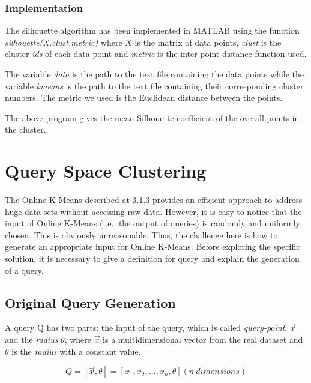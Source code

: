 \documentclass{lmproj}
\begin{document}
\subsubsection{Implementation}
The silhouette algorithm has been implemented in MATLAB using the function \textit{silhouette(X,clust,metric)} where $X$ is the matrix of data points, \textit{clust} is the cluster \textit{ids} of each data point and \textit{metric} is the inter-point distance function used. 

The variable \textit{data} is the path to the text file containing the data points while the variable \textit{kmeans} is the path to the text file containing their corresponding cluster numbers. The metric we used is the Euclidean distance between the points.


The above program gives the mean Silhouette coefficient of the overall points in the cluster.

\clearpage
\section{Query Space Clustering}

The Online K-Means described at 3.1.3 provides an efficient approach to address huge data sets without accessing raw data. However, it is easy to notice that the input of Online K-Means (i.e., the output of queries) is randomly and uniformly chosen. This is obviously unreasonable. Thus, the challenge here is how to generate an appropriate input for Online K-Means. Before exploring the specific solution, it is necessary to give a definition for query and explain the generation of a query. 

\subsection{Original Query Generation}

A query Q has two parts: the input of the query, which is called \textit{query-point}, $\vec{x} $ and the \textit{radius} $ \theta $, where $\vec{x} $ is a multidimensional vector from the real dataset and $ \theta $ is the \textit{radius} with a constant value. 

\begin{equation}
	Q =[\vec{x},\theta] =[x_1,x_2,...,x_n,\theta] (n\ dimensions)
\end{equation}
\end{document}
